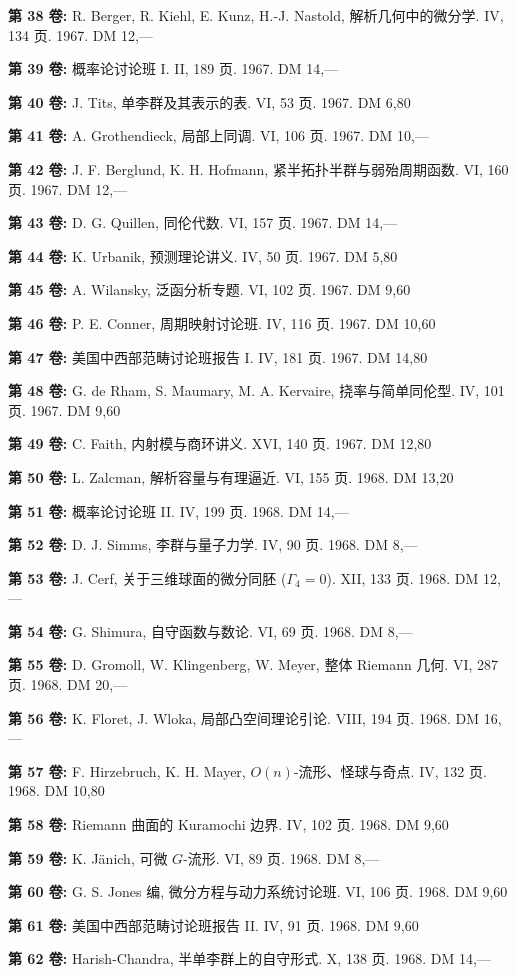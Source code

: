 \clearpage
\begingroup
\sffamily\fontsize{8}{10.5}\selectfont
\setlength{\parindent}{0pt}\setlength{\parskip}{3pt}
\setlength{\columnsep}{6mm}
\providecommand{\sgaCatalogEntry}[6]{\noindent\textbf{第 #1 卷:} #2#3. #4 页. #5. DM #6\par}
\sgaCatalogEntry{38}{R. Berger, R. Kiehl, E. Kunz, H.-J. Nastold, }{解析几何中的微分学}{IV, 134}{1967}{12,—}
\sgaCatalogEntry{39}{}{概率论讨论班 I}{II, 189}{1967}{14,—}
\sgaCatalogEntry{40}{J. Tits, }{单李群及其表示的表}{VI, 53}{1967}{6,80}
\sgaCatalogEntry{41}{A. Grothendieck, }{局部上同调}{VI, 106}{1967}{10,—}
\sgaCatalogEntry{42}{J. F. Berglund, K. H. Hofmann, }{紧半拓扑半群与弱殆周期函数}{VI, 160}{1967}{12,—}
\sgaCatalogEntry{43}{D. G. Quillen, }{同伦代数}{VI, 157}{1967}{14,—}
\sgaCatalogEntry{44}{K. Urbanik, }{预测理论讲义}{IV, 50}{1967}{5,80}
\sgaCatalogEntry{45}{A. Wilansky, }{泛函分析专题}{VI, 102}{1967}{9,60}
\sgaCatalogEntry{46}{P. E. Conner, }{周期映射讨论班}{IV, 116}{1967}{10,60}
\sgaCatalogEntry{47}{}{美国中西部范畴讨论班报告 I}{IV, 181}{1967}{14,80}
\sgaCatalogEntry{48}{G. de Rham, S. Maumary, M. A. Kervaire, }{挠率与简单同伦型}{IV, 101}{1967}{9,60}
\sgaCatalogEntry{49}{C. Faith, }{内射模与商环讲义}{XVI, 140}{1967}{12,80}
\sgaCatalogEntry{50}{L. Zalcman, }{解析容量与有理逼近}{VI, 155}{1968}{13,20}
\sgaCatalogEntry{51}{}{概率论讨论班 II}{IV, 199}{1968}{14,—}
\sgaCatalogEntry{52}{D. J. Simms, }{李群与量子力学}{IV, 90}{1968}{8,—}
\sgaCatalogEntry{53}{J. Cerf, }{关于三维球面的微分同胚 ($\Gamma_4=0$)}{XII, 133}{1968}{12,—}
\sgaCatalogEntry{54}{G. Shimura, }{自守函数与数论}{VI, 69}{1968}{8,—}
\sgaCatalogEntry{55}{D. Gromoll, W. Klingenberg, W. Meyer, }{整体 Riemann 几何}{VI, 287}{1968}{20,—}
\sgaCatalogEntry{56}{K. Floret, J. Wloka, }{局部凸空间理论引论}{VIII, 194}{1968}{16,—}
\sgaCatalogEntry{57}{F. Hirzebruch, K. H. Mayer, }{$O(n)$-流形、怪球与奇点}{IV, 132}{1968}{10,80}
\sgaCatalogEntry{58}{}{Riemann 曲面的 Kuramochi 边界}{IV, 102}{1968}{9,60}
\sgaCatalogEntry{59}{K. Jänich, }{可微 $G$-流形}{VI, 89}{1968}{8,—}
\sgaCatalogEntry{60}{G. S. Jones 编, }{微分方程与动力系统讨论班}{VI, 106}{1968}{9,60}
\sgaCatalogEntry{61}{}{美国中西部范畴讨论班报告 II}{IV, 91}{1968}{9,60}
\sgaCatalogEntry{62}{Harish-Chandra, }{半单李群上的自守形式}{X, 138}{1968}{14,—}
\clearpage
\onecolumn
\endgroup
